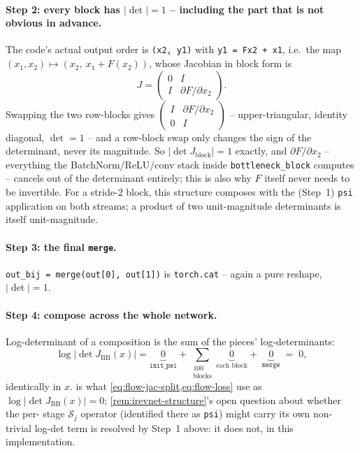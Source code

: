 \paragraph{Step 2: every block has $|\det|=1$ -- including the part that is not obvious in advance.} The
code's actual output order is \texttt{(x2, y1)} with \texttt{y1 = Fx2 + x1}, i.e.\ the map
$(x_1,x_2)\mapsto(x_2,\ x_1+F(x_2))$, whose Jacobian in block form is
\begin{equation}
J=\begin{pmatrix}0 & I\\ I & \partial F/\partial x_2\end{pmatrix}.
\label{eq:irn-block-jac}
\end{equation}
Swapping the two row-blocks gives $\begin{pmatrix}I & \partial F/\partial x_2\\ 0 & I\end{pmatrix}$ --
upper-triangular, identity diagonal, $\det=1$ -- and a row-block swap only changes the sign of the
determinant, never its magnitude. So $|\det J_{\text{block}}|=1$ exactly, and 
$\partial F/\partial x_2$ -- everything the BatchNorm/ReLU/conv stack inside \linebreak
\texttt{bottleneck\_block} computes -- cancels out of the
determinant entirely; this is also why $F$ itself never needs to be invertible. For a stride-$2$ block, 
this structure composes with the (Step~1) \texttt{psi} application on both streams; a product of two
unit-magnitude determinants is itself unit-magnitude.

\paragraph{Step 3: the final \texttt{merge}.} \texttt{out\_bij = merge(out[0], out[1])} is
\texttt{torch.cat} -- again a pure reshape, $|\det|=1$.

\paragraph{Step 4: compose across the whole network.} Log-determinant of a composition is the sum of the
pieces' log-determinants:
\begin{equation}
\log\bigl|\det J_{\mathrm{BB}}(x)\bigr| = \underbrace{0}_{\texttt{init\_psi}} \!\!+
\sum_{\substack{\text{100}\\\text{blocks}}} \underbrace{0}_{\text{each block}} \!\!+\; 
\underbrace{0}_{\texttt{merge}} \;=\; 0,
\label{eq:irn-total-jac}
\end{equation}
identically in $x$.  is what \cref{eq:flow-jac-split,eq:flow-loss} use as
$\log|\det J_{\mathrm{BB}}(x)|=0$; \cref{rem:irevnet-structure}'s open question about whether the per-
stage $\mathcal S_j$ operator (identified there as \texttt{psi}) might carry its own non-trivial log-det 
term is resolved by Step~1 above: it does not, in this implementation.

